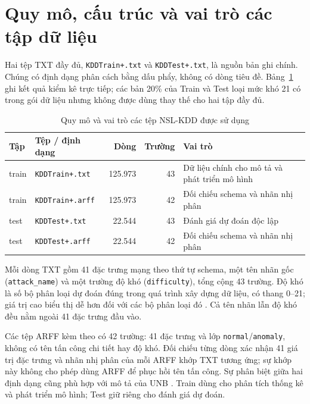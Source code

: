 \section{Quy mô, cấu trúc và vai trò các tập dữ liệu}
Hai tệp TXT đầy đủ, \texttt{KDDTrain+.txt} và \texttt{KDDTest+.txt}, là nguồn bản ghi chính. Chúng có định dạng phân cách bằng dấu phẩy, không có dòng tiêu đề. Bảng~\ref{tab:chuong2:inventory} ghi kết quả kiểm kê trực tiếp; các bản 20\% của Train và Test loại mức khó 21 có trong gói dữ liệu nhưng không được dùng thay thế cho hai tập đầy đủ.
\begin{table}[H]\centering
\caption{Quy mô và vai trò các tệp NSL-KDD được sử dụng}
\label{tab:chuong2:inventory}
\small\setlength{\tabcolsep}{4pt}
\begin{tabular}{l>{\raggedright\arraybackslash}p{3.6cm}rr>{\raggedright\arraybackslash}p{5cm}}\toprule
Tập & Tệp / định dạng & Dòng & Trường & Vai trò\\\midrule
train & \texttt{KDDTrain+.txt} & 125.973 & 43 & Dữ liệu chính cho mô tả và phát triển mô hình\\
train & \texttt{KDDTrain+.arff} & 125.973 & 42 & Đối chiếu schema và nhãn nhị phân\\
test & \texttt{KDDTest+.txt} & 22.544 & 43 & Đánh giá dự đoán độc lập\\
test & \texttt{KDDTest+.arff} & 22.544 & 42 & Đối chiếu schema và nhãn nhị phân\\
\bottomrule\end{tabular}\end{table}
Mỗi dòng TXT gồm 41 đặc trưng mạng theo thứ tự schema, một tên nhãn gốc (\texttt{attack\_name}) và một trường độ khó (\texttt{difficulty}), tổng cộng 43 trường. Độ khó là số bộ phân loại dự đoán đúng trong quá trình xây dựng dữ liệu, có thang 0--21; giá trị cao biểu thị dễ hơn đối với các bộ phân loại đó \cite{task2_unb2009}. Cả tên nhãn lẫn độ khó đều nằm ngoài 41 đặc trưng đầu vào.

Các tệp ARFF kèm theo có 42 trường: 41 đặc trưng và lớp \texttt{normal}/\texttt{anomaly}, không có tên tấn công chi tiết hay độ khó. Đối chiếu từng dòng xác nhận 41 giá trị đặc trưng và nhãn nhị phân của mỗi ARFF khớp TXT tương ứng; sự khớp này không cho phép dùng ARFF để phục hồi tên tấn công. Sự phân biệt giữa hai định dạng cũng phù hợp với mô tả của UNB \cite{task2_unb2009}. Train dùng cho phân tích thống kê và phát triển mô hình; Test giữ riêng cho đánh giá dự đoán.

